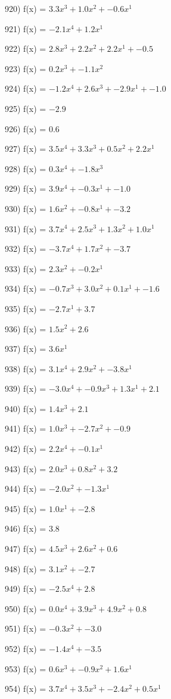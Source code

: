 \documentclass[10pt,a4paper]{article}
\begin{document}
920) f(x) = $3.3x^3 + 1.0x^2 + -0.6x^1$

921) f(x) = $-2.1x^4 + 1.2x^1$

922) f(x) = $2.8x^3 + 2.2x^2 + 2.2x^1 + -0.5$

923) f(x) = $0.2x^3 + -1.1x^2$

924) f(x) = $-1.2x^4 + 2.6x^3 + -2.9x^1 + -1.0$

925) f(x) = $-2.9$

926) f(x) = $0.6$

927) f(x) = $3.5x^4 + 3.3x^3 + 0.5x^2 + 2.2x^1$

928) f(x) = $0.3x^4 + -1.8x^3$

929) f(x) = $3.9x^4 + -0.3x^1 + -1.0$

930) f(x) = $1.6x^2 + -0.8x^1 + -3.2$

931) f(x) = $3.7x^4 + 2.5x^3 + 1.3x^2 + 1.0x^1$

932) f(x) = $-3.7x^4 + 1.7x^2 + -3.7$

933) f(x) = $2.3x^2 + -0.2x^1$

934) f(x) = $-0.7x^3 + 3.0x^2 + 0.1x^1 + -1.6$

935) f(x) = $-2.7x^1 + 3.7$

936) f(x) = $1.5x^2 + 2.6$

937) f(x) = $3.6x^1$

938) f(x) = $3.1x^4 + 2.9x^2 + -3.8x^1$

939) f(x) = $-3.0x^4 + -0.9x^3 + 1.3x^1 + 2.1$

940) f(x) = $1.4x^3 + 2.1$

941) f(x) = $1.0x^3 + -2.7x^2 + -0.9$

942) f(x) = $2.2x^4 + -0.1x^1$

943) f(x) = $2.0x^3 + 0.8x^2 + 3.2$

944) f(x) = $-2.0x^2 + -1.3x^1$

945) f(x) = $1.0x^1 + -2.8$

946) f(x) = $3.8$

947) f(x) = $4.5x^3 + 2.6x^2 + 0.6$

948) f(x) = $3.1x^2 + -2.7$

949) f(x) = $-2.5x^4 + 2.8$

950) f(x) = $0.0x^4 + 3.9x^3 + 4.9x^2 + 0.8$

951) f(x) = $-0.3x^2 + -3.0$

952) f(x) = $-1.4x^4 + -3.5$

953) f(x) = $0.6x^3 + -0.9x^2 + 1.6x^1$

954) f(x) = $3.7x^4 + 3.5x^3 + -2.4x^2 + 0.5x^1$
\end{document}
